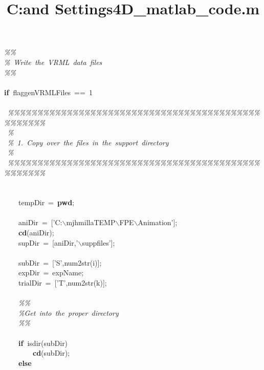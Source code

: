 \documentclass{article}
\title{C:\Documents and Settings\mjhmilla\DynaFlexAnimation\Solvere4D\Manual\source\example_matlab_code.m}
\newcommand{\hlstd}[1]{\textcolor[rgb]{0,0,0}{#1}}
\newcommand{\hlkey}[1]{\textcolor[rgb]{0,0,1}{\bf{#1}}}
\newcommand{\hlnum}[1]{\textcolor[rgb]{0.66,0,0.66}{#1}}
\newcommand{\hltyp}[1]{\textcolor[rgb]{0,0,1}{#1}}
\newcommand{\hlcom}[1]{\textcolor[rgb]{0.4,0.4,0.4}{\it{#1}}}
\begin{document}
\pagecolor{bgcolor}
\noindent
\ttfamily
\hlstd{}\hlcom{\%\%\\
}\hlstd{}\hlcom{\%\ Write\ the\ VRML\ data\ files\\
}\hlstd{}\hlcom{\%\%\mbox{}\\
}\hlstd{\\
}\hlkey{if\ }\hlstd{flag\textunderscore genVRMLFiles\ ==\ }\hlnum{1\mbox{}\\
\\
\ }\hlstd{}\hlcom{\%\%\%\%\%\%\%\%\%\%\%\%\%\%\%\%\%\%\%\%\%\%\%\%\%\%\%\%\%\%\%\%\%\%\%\%\%\%\%\%\%\%\%\%\%\%\%\%\%\%\\
}\hlstd{\ }\hlcom{\%\\
}\hlstd{\ }\hlcom{\%\ 1.\ Copy\ over\ the\ files\ in\ the\ support\ directory\\
}\hlstd{\ }\hlcom{\%\\
}\hlstd{\ }\hlcom{\%\%\%\%\%\%\%\%\%\%\%\%\%\%\%\%\%\%\%\%\%\%\%\%\%\%\%\%\%\%\%\%\%\%\%\%\%\%\%\%\%\%\%\%\%\%\%\%\%\%\mbox{}\\
}\hlstd{\mbox{}\\
\\
\hlstd{\ \ \ \ }}\hltyp{tempDir\ }\hlstd{=\ }\hlkey{pwd}\hlstd{;\mbox{}\\
\\
\hlstd{\ \ \ \ }aniDir\ =\ ['C:$\backslash$mjhmilla\textunderscore TEMP$\backslash$FPE$\backslash$Animation'];\\
\hlstd{\ \ \ \ }}\hlkey{cd}\hlstd{(aniDir);\\
\hlstd{\ \ \ \ }supDir\ =\ [aniDir,'$\backslash$suppfiles'];\mbox{}\\
\\
\hlstd{\ \ \ \ }subDir\ =\ ['S',}\hltyp{num2str}\hlstd{(i)];\\
\hlstd{\ \ \ \ }expDir\ =\ expName;\\
\hlstd{\ \ \ \ }trialDir\ =\ ['T',}\hltyp{num2str}\hlstd{(k)];\mbox{}\\
\\
\hlstd{\ \ \ \ }}\hlcom{\%\%\\
}\hlstd{\hlstd{\ \ \ \ }}\hlcom{\%Get\ into\ the\ proper\ directory\\
}\hlstd{\hlstd{\ \ \ \ }}\hlcom{\%\%\mbox{}\\
}\hlstd{\\
\hlstd{\ \ \ \ }}\hlkey{if\ }\hlstd{isdir(subDir)\\
\hlstd{\ \ \ \ \ \ \ \ }}\hlkey{cd}\hlstd{(subDir);\\
\hlstd{\ \ \ \ }}\hlkey{else\\
}
\end{document}
